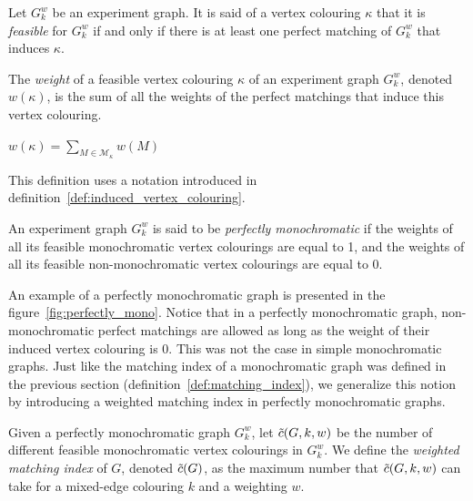 \begin{definition}
    \label{def:feasible_vertex_colouring}
    Let $G_k^w$ be an experiment graph.
    It is said of a vertex colouring $\kappa$ that it is \textit{feasible} for $G_k^w$ if and only if there is at least one perfect matching of $G_k^w$ that induces $\kappa$.
\end{definition}

\begin{definition}
    \label{def:vertex_colouring_weight}
    The \textit{weight} of a feasible vertex colouring $\kappa$ of an experiment graph $G_k^w$, denoted $w(\kappa)$, is the sum of all the weights of the perfect matchings that induce this vertex colouring.
    
    \begin{center}
        $w(\kappa) = \sum\limits_{M \in \mathcal{M}_{\kappa}} w(M)$
    \end{center}

    This definition uses a notation introduced in definition~\ref{def:induced_vertex_colouring}.
\end{definition}

\begin{definition}
    \label{def:perfectly_monochromatic_graph}
    An experiment graph $G_k^w$ is said to be \textit{perfectly monochromatic} if the weights of all its feasible monochromatic vertex colourings are equal to 1, and the weights of all its feasible non-monochromatic vertex colourings are equal to 0.
\end{definition}

An example of a perfectly monochromatic graph is presented in the figure~\ref{fig:perfectly_mono}.
Notice that in a perfectly monochromatic graph, non-monochromatic perfect matchings are allowed as long as the weight of their induced vertex colouring is 0.
This was not the case in simple monochromatic graphs.
Just like the matching index of a monochromatic graph was defined in the previous section (definition~\ref{def:matching_index}), we generalize this notion by introducing a weighted matching index in perfectly monochromatic graphs.

\begin{definition}
    \label{def:weighted_matching_index}
    Given a perfectly monochromatic graph $G_k^w$, let $\Tilde{c}(G, k, w)$ be the number of different feasible monochromatic vertex colourings in $G_k^w$.
    We define the \textit{weighted matching index} of $G$, denoted $\Tilde{c}(G)$, as the maximum number that $\Tilde{c}(G, k, w)$ can take for a mixed-edge colouring $k$ and a weighting $w$.
\end{definition}

